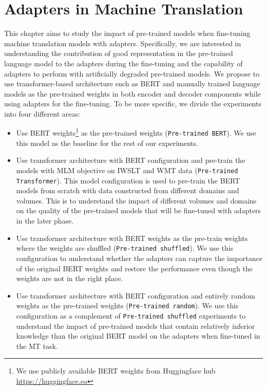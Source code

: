 
\chapter{Adapters in Machine Translation}
\label{chap:adaptmt}
This chapter aims to study the impact of pre-trained models when fine-tuning machine translation models with adapters. Specifically, we are interested in understanding the contribution of good representation in the pre-trained language model to the adapters during the fine-tuning and the capability of adapters to perform with artificially degraded pre-trained models. We propose to use transformer-based architecture such as BERT and manually trained language models as the pre-trained weights in both encoder and decoder components while using adapters for the fine-tuning. To be more specific, we divide the experiments into four different areas:
\begin{itemize}
    \item Use BERT weights\footnote{We use publicly available BERT weights from Huggingface hub \url{https://huggingface.co}} as the pre-trained weights (\texttt{Pre-trained BERT}). We use this model as the baseline for the rest of our experiments.
    \item Use transformer architecture with BERT configuration and pre-train the models with MLM objective on IWSLT and WMT data (\texttt{Pre-trained Transformer}). This model configuration is used to pre-train the BERT models from scratch with data constructed from different domains and volumes. This is to understand the impact of different volumes and domains on the quality of the pre-trained models that will be fine-tuned with adapters in the later phase.
    \item Use transformer architecture with BERT weights as the pre-train weights where the weights are shuffled (\texttt{Pre-trained shuffled}). We use this configuration to understand whether the adapters can capture the importance of the original BERT weights and restore the performance even though the weights are not in the right place.
    \item Use transformer architecture with BERT configuration and entirely random weights as the pre-trained weights (\texttt{Pre-trained random}). We use this configuration as a complement of \texttt{Pre-trained shuffled} experiments to understand the impact of pre-trained models that contain relatively inferior knowledge than the original BERT model on the adapters when fine-tuned in the MT task.
\end{itemize}


